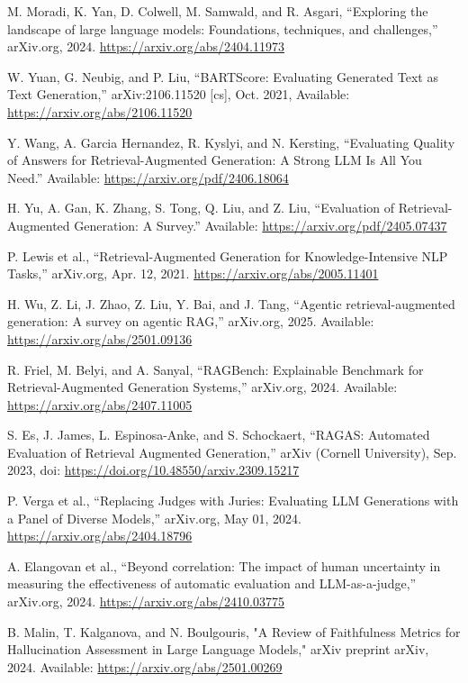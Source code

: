 \begin{thebibliography}{00}
 M. Moradi, K. Yan, D. Colwell, M. Samwald, and R. Asgari, “Exploring the landscape of large language models: Foundations, techniques, and challenges,” arXiv.org, 2024. \url{ https://arxiv.org/abs/2404.11973}

W. Yuan, G. Neubig, and P. Liu, “BARTScore: Evaluating Generated Text as Text Generation,” arXiv:2106.11520 [cs], Oct. 2021, Available: \url{https://arxiv.org/abs/2106.11520}

 Y. Wang, A. Garcia Hernandez, R. Kyslyi, and N. Kersting, “Evaluating Quality of Answers for Retrieval-Augmented Generation: A Strong LLM Is All You Need.” Available: \url{https://arxiv.org/pdf/2406.18064}

 H. Yu, A. Gan, K. Zhang, S. Tong, Q. Liu, and Z. Liu, “Evaluation of Retrieval-Augmented Generation: A Survey.” Available: \url{https://arxiv.org/pdf/2405.07437}

 P. Lewis et al., “Retrieval-Augmented Generation for Knowledge-Intensive NLP Tasks,” arXiv.org, Apr. 12, 2021. \url{https://arxiv.org/abs/2005.11401}

 H. Wu, Z. Li, J. Zhao, Z. Liu, Y. Bai, and J. Tang, “Agentic retrieval-augmented generation: A survey on agentic RAG,” arXiv.org, 2025. Available: \url{https://arxiv.org/abs/2501.09136}

 R. Friel, M. Belyi, and A. Sanyal, “RAGBench: Explainable Benchmark for Retrieval-Augmented Generation Systems,” arXiv.org, 2024. Available: \url{https://arxiv.org/abs/2407.11005}

 S. Es, J. James, L. Espinosa-Anke, and S. Schockaert, “RAGAS: Automated Evaluation of Retrieval Augmented Generation,” arXiv (Cornell University), Sep. 2023, doi: \url{https://doi.org/10.48550/arxiv.2309.15217}

 P. Verga et al., “Replacing Judges with Juries: Evaluating LLM Generations with a Panel of Diverse Models,” arXiv.org, May 01, 2024. \url{https://arxiv.org/abs/2404.18796}

 A. Elangovan et al., “Beyond correlation: The impact of human uncertainty in measuring the effectiveness of automatic evaluation and LLM-as-a-judge,” arXiv.org, 2024. \url{https://arxiv.org/abs/2410.03775}

 B. Malin, T. Kalganova, and N. Boulgouris, "A Review of Faithfulness Metrics for Hallucination Assessment in Large Language Models," arXiv preprint arXiv, 2024. Available: \url{https://arxiv.org/abs/2501.00269}


\end{thebibliography}
